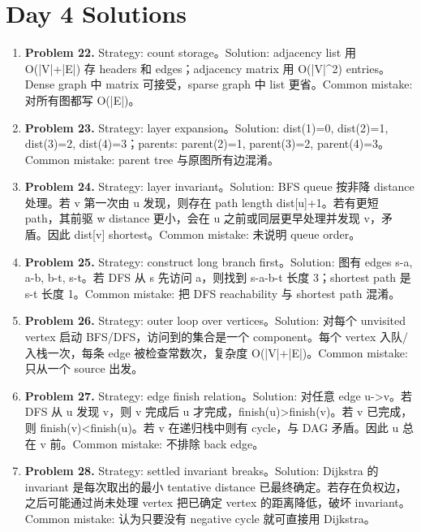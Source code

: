 \documentclass[11pt]{ctexart}
\begin{document}
\section{Day 4 Solutions}
\begin{enumerate}
  \item \textbf{Problem 22.} Strategy: count storage。Solution: adjacency list 用 O(|V|+|E|) 存 headers 和 edges；adjacency matrix 用 O(|V|\textasciicircum{}2) entries。Dense graph 中 matrix 可接受，sparse graph 中 list 更省。Common mistake: 对所有图都写 O(|E|)。
  \item \textbf{Problem 23.} Strategy: layer expansion。Solution: dist(1)=0, dist(2)=1, dist(3)=2, dist(4)=3；parents: parent(2)=1, parent(3)=2, parent(4)=3。Common mistake: parent tree 与原图所有边混淆。
  \item \textbf{Problem 24.} Strategy: layer invariant。Solution: BFS queue 按非降 distance 处理。若 v 第一次由 u 发现，则存在 path length dist[u]+1。若有更短 path，其前驱 w distance 更小，会在 u 之前或同层更早处理并发现 v，矛盾。因此 dist[v] shortest。Common mistake: 未说明 queue order。
  \item \textbf{Problem 25.} Strategy: construct long branch first。Solution: 图有 edges s-a, a-b, b-t, s-t。若 DFS 从 s 先访问 a，则找到 s-a-b-t 长度 3；shortest path 是 s-t 长度 1。Common mistake: 把 DFS reachability 与 shortest path 混淆。
  \item \textbf{Problem 26.} Strategy: outer loop over vertices。Solution: 对每个 unvisited vertex 启动 BFS/DFS，访问到的集合是一个 component。每个 vertex 入队/入栈一次，每条 edge 被检查常数次，复杂度 O(|V|+|E|)。Common mistake: 只从一个 source 出发。
  \item \textbf{Problem 27.} Strategy: edge finish relation。Solution: 对任意 edge u->v。若 DFS 从 u 发现 v，则 v 完成后 u 才完成，finish(u)>finish(v)。若 v 已完成，则 finish(v)<finish(u)。若 v 在递归栈中则有 cycle，与 DAG 矛盾。因此 u 总在 v 前。Common mistake: 不排除 back edge。
  \item \textbf{Problem 28.} Strategy: settled invariant breaks。Solution: Dijkstra 的 invariant 是每次取出的最小 tentative distance 已最终确定。若存在负权边，之后可能通过尚未处理 vertex 把已确定 vertex 的距离降低，破坏 invariant。Common mistake: 认为只要没有 negative cycle 就可直接用 Dijkstra。
\end{enumerate}
\end{document}
